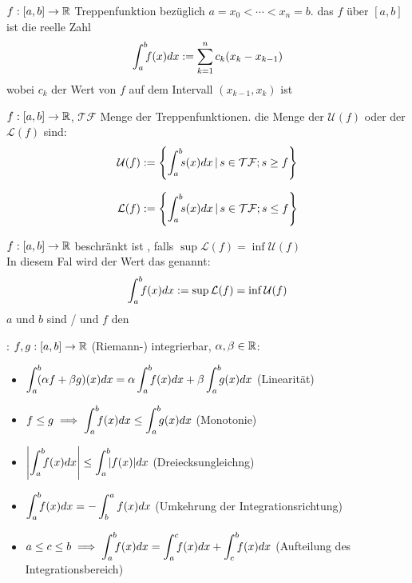 \Def $f: [a, b] \to \mathbb{R}$ Treppenfunktion bezüglich $a = x_0 < \cdots < x_n = b$. das
 $f$ über $[a, b]$ ist die reelle Zahl
$$\int_a^b \hspace{-4pt} f(x) dx := \sum_{k=1}^{n} c_k(x_k - x_{k-1})$$
wobei $c_k$ der Wert von $f$ auf dem Intervall $(x_{k-1}, x_k)$ ist

\Def $f: [a,b] \to \mathbb{R}$, $\mathcal{TF}$ Menge der Treppenfunktionen.
die Menge der  $\mathcal U (f)$ oder der 
$\mathcal L (f)$ sind:
$$\mathcal U (f) := \left\{\int_a^b \hspace{-4pt}s(x)dx \, | \, s \in \mathcal{TF}; s \ge f\right\}$$

$$\mathcal L (f) := \left\{\int_a^b \hspace{-4pt}s(x)dx \, | \, s \in \mathcal{TF}; s \le f\right\}$$

\Def $f: [a, b] \to \mathbb{R}$ beschränkt ist ,
falls $\sup \mathcal L (f) = \inf \mathcal U (f)$ \\
In diesem Fal wird der Wert das  genannt:
$$\int_a^b \hspace{-4pt}f(x) dx := \sup \mathcal L (f) = \inf \mathcal U (f)$$
$a$ und $b$ sind / und $f$ den 

\Satz {}: $f,g: [a,b] \to \mathbb{R}$ (Riemann-) integrierbar,
$\alpha, \beta \in \mathbb{R}$:
\vspace{-0.6em}
\begin{itemize}
    \item $\displaystyle \int_a^b \hspace{-4pt} (\alpha f + \beta g)(x) dx = \alpha \int_a^b \hspace{-4pt} f(x) dx + \beta \int_a^b \hspace{-4pt} g(x) dx$ (Linearität)
    \item $\displaystyle f \le g \implies \int_a^b \hspace{-4pt} f(x) dx \le \int_a^b \hspace{-4pt}g(x) dx$ (Monotonie)
    \item $\displaystyle \left|\int_a^b \hspace{-4pt} f(x) dx\right| \le \int_a^b \hspace{-4pt} |f(x)| dx$ (Dreiecksungleichng)
    \item $\displaystyle \int_a^b \hspace{-4pt} f(x) dx = -\int_{b}^{a} f(x) dx$ (Umkehrung der Integrationsrichtung)
    \item $\displaystyle a \le c \le b \implies \int_a^b \hspace{-4pt} f(x) dx = \int_a^c \hspace{-4pt} f(x) dx + \int_c^b \hspace{-4pt} f(x) dx$ (Aufteilung des Integrationsbereich)
\end{itemize}

